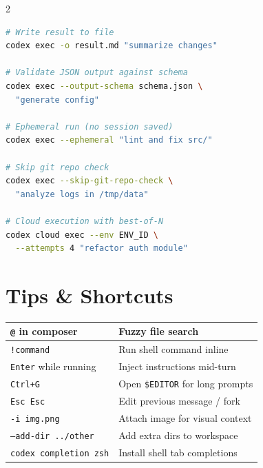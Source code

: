 \documentclass[a4paper, 9pt]{scrartcl}
\makeatletter
\newcommand{\cmdtable}[1]{%
  \smallskip
  \begin{tabularx}{\columnwidth}{@{}lX@{}}
  \toprule
  #1
  \bottomrule
  \end{tabularx}
  \smallskip
}
\makeatother
\begin{document}
\begin{multicols}{2}
\begin{lstlisting}[language=bash]
# Write result to file
codex exec -o result.md "summarize changes"

# Validate JSON output against schema
codex exec --output-schema schema.json \
  "generate config"

# Ephemeral run (no session saved)
codex exec --ephemeral "lint and fix src/"

# Skip git repo check
codex exec --skip-git-repo-check \
  "analyze logs in /tmp/data"

# Cloud execution with best-of-N
codex cloud exec --env ENV_ID \
  --attempts 4 "refactor auth module"
\end{lstlisting}

\section{Tips \& Shortcuts}

\cmdtable{
\texttt{@} in composer & Fuzzy file search \\
\midrule
\texttt{!command} & Run shell command inline \\
\midrule
\texttt{Enter} while running & Inject instructions mid-turn \\
\midrule
\texttt{Ctrl+G} & Open \texttt{\$EDITOR} for long prompts \\
\midrule
\texttt{Esc Esc} & Edit previous message / fork \\
\midrule
\texttt{-i img.png} & Attach image for visual context \\
\midrule
\texttt{--add-dir ../other} & Add extra dirs to workspace \\
\midrule
\texttt{codex completion zsh} & Install shell tab completions \\
}

\end{multicols}
\end{document}
